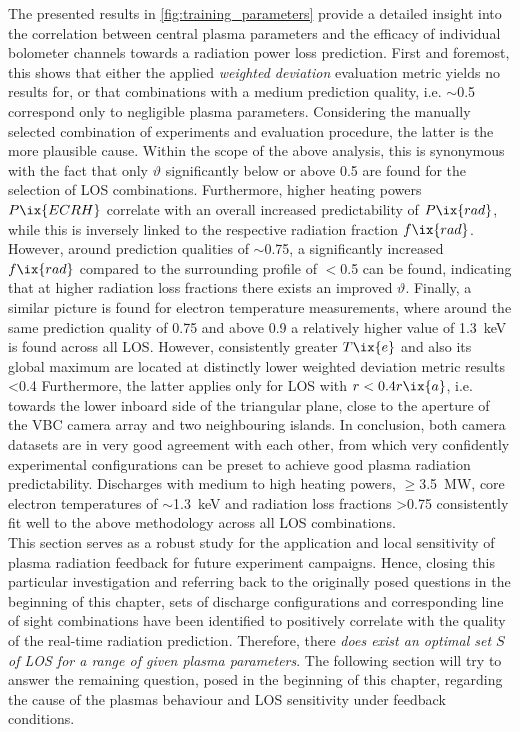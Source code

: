         The presented results in \cref{fig:training_parameters} provide a detailed insight into the correlation between central plasma parameters and the efficacy of individual bolometer channels towards a radiation power loss prediction. First and foremost, this shows that either the applied \textit{weighted deviation} evaluation metric yields no results for, or that combinations with a medium prediction quality, i.e. $\sim$\SI{0.5}{\arbitraryunit} correspond only to negligible plasma parameters. Considering the manually selected combination of experiments and evaluation procedure, the latter is the more plausible cause.  Within the scope of the above analysis, this is synonymous with the fact that only $\vartheta$ significantly below or above \SI{0.5}{\arbitraryunit} are found for the selection of LOS combinations. Furthermore, higher heating powers $P\ix{ECRH}$ correlate with an overall increased predictability of $P\ix{rad}$, while this is inversely linked to the respective radiation fraction $f\ix{rad}$. However, around prediction qualities of $\sim$\SI{0.75}{\arbitraryunit}, a significantly increased $f\ix{rad}$ compared to the surrounding profile of $<$\SI{0.5}{\arbitraryunit} can be found, indicating that at higher radiation loss fractions there exists an improved $\vartheta$. Finally, a similar picture is found for electron temperature measurements, where around the same prediction quality of \SI{0.75}{\arbitraryunit} and above \SI{0.9}{\arbitraryunit} a relatively higher value of \SI{1.3}{\kilo\electronvolt} is found across all LOS. However, consistently greater $T\ix{e}$ and also its global maximum are located at distinctly lower weighted deviation metric results <\SI{0.4}{\arbitraryunit} Furthermore, the latter applies only for LOS with $r<0.4r\ix{a}$, i.e. towards the lower inboard side of the triangular plane, close to the aperture of the VBC camera array and two neighbouring islands. In conclusion, both camera datasets are in very good agreement with each other, from which very confidently experimental configurations can be preset to achieve good plasma radiation predictability. Discharges with medium to high heating powers, $\ge$\SI{3.5}{\mega\watt}, core electron temperatures of $\sim$\SI{1.3}{\kilo\electronvolt} and radiation loss fractions >\SI{0.75}{\arbitraryunit} consistently fit well to the above methodology across all LOS combinations.\\%
%
        \newline%
        This section serves as a robust study for the application and local sensitivity of plasma radiation feedback for future experiment campaigns. Hence, closing this particular investigation and referring back to the originally posed questions in the beginning of this chapter, sets of discharge configurations and corresponding line of sight combinations have been identified to positively correlate with the quality of the real-time radiation prediction. Therefore, there \textit{does exist an optimal set $S$ of LOS for a range of given plasma parameters}. The following section will try to answer the remaining question, posed in the beginning of this chapter, regarding the cause of the plasmas behaviour and LOS sensitivity under feedback conditions.%
%